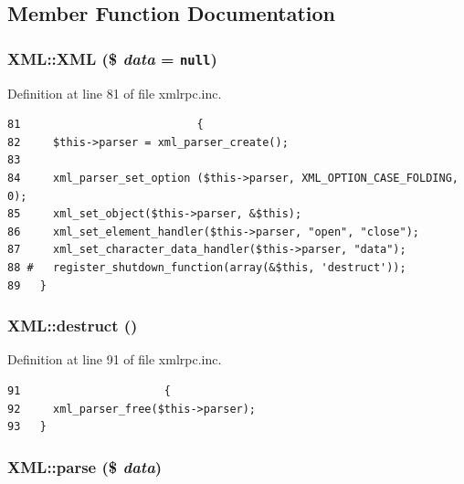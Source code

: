 \subsection{Member Function Documentation}
\hypertarget{classXML_1475a1374023931e2227277f4047c9aa}{
\subsubsection{\setlength{\rightskip}{0pt plus 5cm}XML::XML (\$ {\em data} = {\tt null})}}
\label{classXML_1475a1374023931e2227277f4047c9aa}




Definition at line 81 of file xmlrpc.inc.

\begin{Code}\begin{verbatim}81                           {
82     $this->parser = xml_parser_create();
83 
84     xml_parser_set_option ($this->parser, XML_OPTION_CASE_FOLDING, 0);
85     xml_set_object($this->parser, &$this);
86     xml_set_element_handler($this->parser, "open", "close");
87     xml_set_character_data_handler($this->parser, "data");
88 #   register_shutdown_function(array(&$this, 'destruct'));
89   }
\end{verbatim}
\end{Code}


\hypertarget{classXML_d1524d80c783b2cd22966462411b9b7d}{
\subsubsection{\setlength{\rightskip}{0pt plus 5cm}XML::destruct ()}}
\label{classXML_d1524d80c783b2cd22966462411b9b7d}




Definition at line 91 of file xmlrpc.inc.

\begin{Code}\begin{verbatim}91                      {
92     xml_parser_free($this->parser);
93   }
\end{verbatim}
\end{Code}


\hypertarget{classXML_61e6258dc3d5750100e1f0dd08d6334a}{
\subsubsection{\setlength{\rightskip}{0pt plus 5cm}XML::parse (\$ {\em data})}}
\label{classXML_61e6258dc3d5750100e1f0dd08d6334a}




